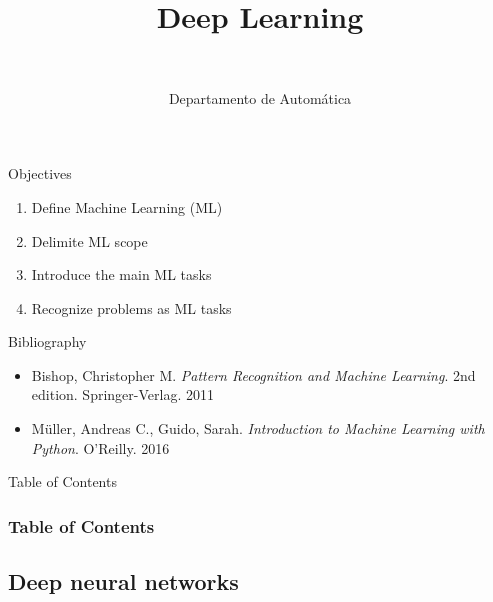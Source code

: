 \documentclass[10pt,compress]{beamer} %
\title[Deep Learning]{Deep Learning}
\author{\asignatura\\\carrera}
\institute{}
\date{Departamento de Automática}
\begin{document}
{\titlepageBlue
    \begin{frame}
        \titlepage
    \end{frame}
}

\institute{\asignatura}

\begin{frame}[plain]{}
   \begin{block}{Objectives}
      \begin{enumerate}
         \item Define Machine Learning (ML)
		 \item Delimite ML scope
         \item Introduce the main ML tasks
         \item Recognize problems as ML tasks
      \end{enumerate} 
   \end{block}

   \begin{block}{Bibliography}
	\begin{itemize}
        \item Bishop, Christopher M. \textit{Pattern Recognition and Machine Learning}. 2nd edition. Springer-Verlag. 2011
        \item M\"uller, Andreas C., Guido, Sarah. \textit{Introduction to Machine Learning with Python}. O'Reilly. 2016
	\end{itemize}
   \end{block}
\end{frame}

{
\begin{frame}[shrink]{Table of Contents}

 	\frametitle{Table of Contents}
  	\begin{multicols}{2}
  		\tableofcontents
    \end{multicols}

\end{frame}
}

\subsection{Deep neural networks}
\end{document}
